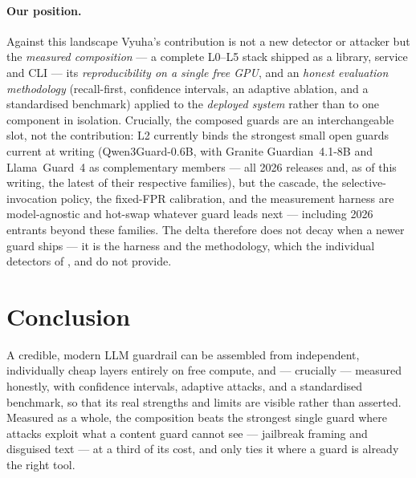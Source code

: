 \documentclass[11pt]{article}
\begin{document}
\paragraph{Our position.} Against this landscape Vyuha's contribution is not a new detector or attacker
but the \emph{measured composition} --- a complete L0--L5 stack shipped as a library, service and CLI ---
its \emph{reproducibility on a single free GPU}, and an \emph{honest evaluation methodology} (recall-first,
confidence intervals, an adaptive ablation, and a standardised benchmark) applied to the \emph{deployed
system} rather than to one component in isolation. Crucially, the composed guards are an interchangeable
slot, not the contribution: L2 currently binds the strongest small open guards current at writing
(Qwen3Guard-0.6B, with Granite Guardian~4.1-8B and Llama~Guard~4 as complementary members --- all 2026
releases and, as of this writing, the latest of their respective families), but the cascade, the
selective-invocation policy, the fixed-FPR calibration, and the measurement harness are model-agnostic
and hot-swap whatever guard leads next --- including 2026 entrants beyond these families. The delta
therefore does not decay when a newer guard ships --- it is the harness and
the methodology, which the individual detectors of \citet{promptshield}, \citet{pismith} and
\citet{haste} do not provide.

\section{Conclusion}
A credible, modern LLM guardrail can be assembled from independent, individually cheap layers entirely
on free compute, and --- crucially --- measured honestly, with confidence intervals, adaptive attacks,
and a standardised benchmark, so that its real strengths and limits are visible rather than asserted.
Measured as a whole, the composition beats the strongest single guard where attacks exploit what a
content guard cannot see --- jailbreak framing and disguised text --- at a third of its cost, and only
ties it where a guard is already the right tool.
\end{document}
